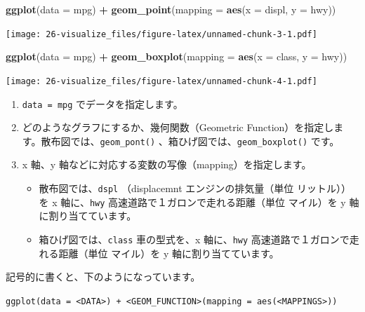 \documentclass[
  xelatex, ja=standard]{bxjsbook}
\newenvironment{Shaded}{\begin{snugshade}}{\end{snugshade}}
\newcommand{\AttributeTok}[1]{\textcolor[rgb]{0.13,0.29,0.53}{#1}}
\newcommand{\FunctionTok}[1]{\textcolor[rgb]{0.13,0.29,0.53}{\textbf{#1}}}
\newcommand{\NormalTok}[1]{#1}
\newcommand{\SpecialCharTok}[1]{\textcolor[rgb]{0.81,0.36,0.00}{\textbf{#1}}}
\theoremstyle{definition}
\theoremstyle{definition}
\theoremstyle{definition}
\theoremstyle{definition}
\theoremstyle{remark}
\begin{document}
\begin{Shaded}
\begin{Highlighting}[]
\FunctionTok{ggplot}\NormalTok{(}\AttributeTok{data =}\NormalTok{ mpg) }\SpecialCharTok{+} \FunctionTok{geom\_point}\NormalTok{(}\AttributeTok{mapping =} \FunctionTok{aes}\NormalTok{(}\AttributeTok{x =}\NormalTok{ displ, }\AttributeTok{y =}\NormalTok{ hwy))}
\end{Highlighting}
\end{Shaded}

\texttt{[image: 26-visualize\_files/figure-latex/unnamed-chunk-3-1.pdf]}

\begin{Shaded}
\begin{Highlighting}[]
\FunctionTok{ggplot}\NormalTok{(}\AttributeTok{data =}\NormalTok{ mpg) }\SpecialCharTok{+} \FunctionTok{geom\_boxplot}\NormalTok{(}\AttributeTok{mapping =} \FunctionTok{aes}\NormalTok{(}\AttributeTok{x =}\NormalTok{ class, }\AttributeTok{y =}\NormalTok{ hwy))}
\end{Highlighting}
\end{Shaded}

\texttt{[image: 26-visualize\_files/figure-latex/unnamed-chunk-4-1.pdf]}

\begin{enumerate}
\def\labelenumi{\arabic{enumi}.}
\item
  \texttt{data\ =\ mpg} でデータを指定します。
\item
  どのようなグラフにするか、幾何関数（Geometric Function）を指定します。散布図では、\texttt{geom\_pont()} 、箱ひげ図では、\texttt{geom\_boxplot()} です。
\item
  x 軸、y 軸などに対応する変数の写像（mapping）を指定します。

  \begin{itemize}
  \item
    散布図では、\texttt{dspl} （displacemnt エンジンの排気量（単位 リットル））を x 軸に、\texttt{hwy} 高速道路で１ガロンで走れる距離（単位 マイル）を y 軸に割り当てています。
  \item
    箱ひげ図では、\texttt{class} 車の型式を、x 軸に、\texttt{hwy} 高速道路で１ガロンで走れる距離（単位 マイル）を y 軸に割り当てています。
  \end{itemize}
\end{enumerate}

記号的に書くと、下のようになっています。

\texttt{ggplot(data\ =\ \textless{}DATA\textgreater{})\ +\ \textless{}GEOM\_FUNCTION\textgreater{}(mapping\ =\ aes(\textless{}MAPPINGS\textgreater{}))}
\end{document}
